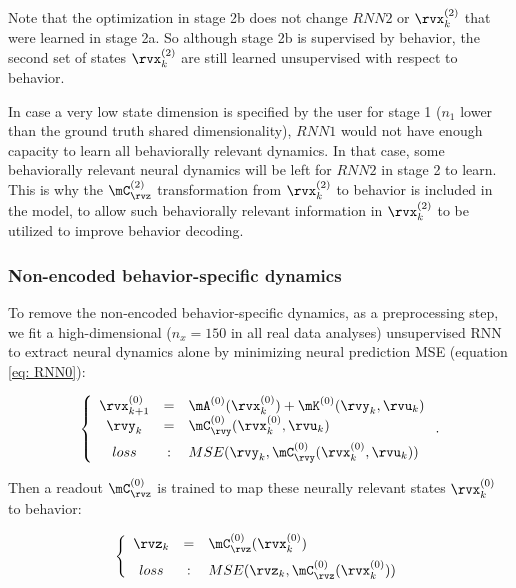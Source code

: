 \documentclass{article} %
\newcommand{\RNN}[1]{\(\textit{RNN#1}\)} %
\begin{document}
Note that the optimization in stage 2b does not change \RNN2 or \(\rvx_{k}^{(2)}\) that were learned in stage 2a. So although stage 2b is supervised by behavior, the second set of states \(\rvx_{k}^{(2)}\) are still learned unsupervised with respect to behavior. 

In case a very low state dimension is specified by the user for stage 1 ($n_1$ lower than the ground truth shared dimensionality), \RNN1{} would not have enough capacity to learn all behaviorally relevant dynamics. In that case, some behaviorally relevant neural dynamics will be left for \RNN2{} in stage 2 to learn. This is why the \(\mC_{\rvz}^{(2)}\) transformation from  \(\rvx_{k}^{(2)}\) to behavior is included in the model, to allow such behaviorally relevant information in \(\rvx_{k}^{(2)}\) to be utilized to improve behavior decoding. 



\subsubsection{Non-encoded behavior-specific dynamics}\label{app: addStep}

To remove the non-encoded behavior-specific dynamics, as a preprocessing step, we fit a high-dimensional ($n_x=150$ in all real data analyses) unsupervised RNN to extract neural dynamics alone by minimizing neural prediction MSE (equation \ref{eq: RNN0}): 

\begin{equation}\label{eq: RNN0}
    \left\{
    \begin{array}{ccl}
    \rvx_{k+1}^{(0)} &=& \mA^{(0)}(\rvx_{k}^{(0)}) + \mK^{(0)}(\rvy_{k}, \rvu_{k})\\  
    \rvy_{k} &=& \mC_{\rvy}^{(0)}(\rvx_{k}^{(0)}, \rvu_{k})\\[5pt]
    loss&:& MSE(\rvy_{k}, \mC_{\rvy}^{(0)}(\rvx_{k}^{(0)}, \rvu_{k}))
    \end{array}
    \right.
    .
\end{equation}

Then a readout \(\mC_{\rvz}^{(0)}\) is trained to map these neurally relevant states \(\rvx_{k}^{(0)}\) to behavior:

\begin{equation}\label{eq: Cz0}
    \left\{
    \begin{array}{ccl}
    \rvz_{k} &=& \mC_{\rvz}^{(0)}(\rvx_{k}^{(0)})\\[5pt]
    loss&:& MSE(\rvz_{k}, \mC_{\rvz}^{(0)}(\rvx_{k}^{(0)}))
    \end{array}
    \right.
\end{equation}
\end{document}
